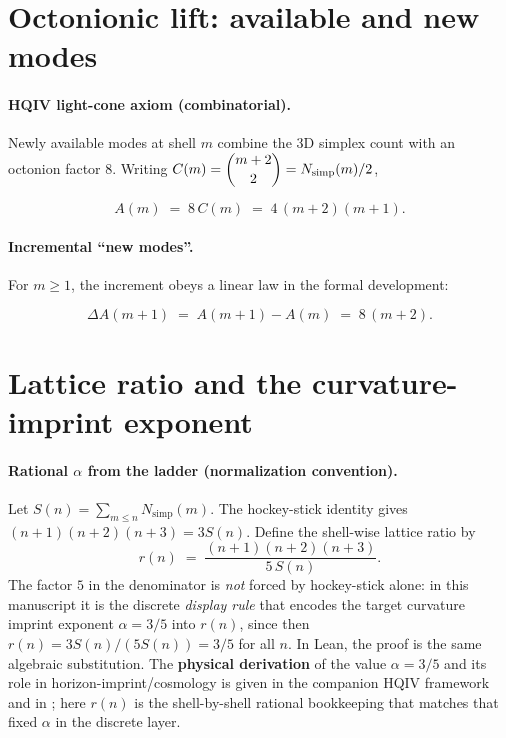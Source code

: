 \documentclass[11pt,a4paper]{article}
\theoremstyle{remark}
\begin{document}
\section{Octonionic lift: available and new modes}

\paragraph{HQIV light-cone axiom (combinatorial).}
Newly available modes at shell $m$ combine the $3$D simplex count with an octonion factor $8$. Writing $C(m)=\dbinom{m+2}{2}=N_{\mathrm{simp}}(m)/2$,

\begin{equation}
  A(m) \;=\; 8\,C(m) \;=\; 4\,(m+2)(m+1).
\end{equation}

\paragraph{Incremental ``new modes''.}
For $m\ge 1$, the increment obeys a linear law in the formal development:

\begin{equation}
  \Delta A(m+1) \;=\; A(m+1)-A(m) \;=\; 8\,(m+2).
\end{equation}

\section{Lattice ratio and the curvature-imprint exponent}

\paragraph{Rational $\alpha$ from the ladder (normalization convention).}
Let $S(n)=\sum_{m\le n}N_{\mathrm{simp}}(m)$. The hockey-stick identity gives $(n+1)(n+2)(n+3)=3S(n)$. Define the shell-wise lattice ratio by
\begin{equation}
  r(n) \;=\; \frac{(n+1)(n+2)(n+3)}{5\,S(n)}.
\end{equation}
The factor $5$ in the denominator is \emph{not} forced by hockey-stick alone: in this manuscript it is the discrete \emph{display rule} that encodes the target curvature imprint exponent $\alpha=3/5$ into $r(n)$, since then $r(n)=3S(n)/(5S(n))=3/5$ for all $n$. In Lean, the proof is the same algebraic substitution. The \textbf{physical derivation} of the value $\alpha=3/5$ and its role in horizon-imprint/cosmology is given in the companion HQIV framework \cite{ettinger2026hqiv} and in \cite{brodie2026}; here $r(n)$ is the shell-by-shell rational bookkeeping that matches that fixed $\alpha$ in the discrete layer.
\end{document}
